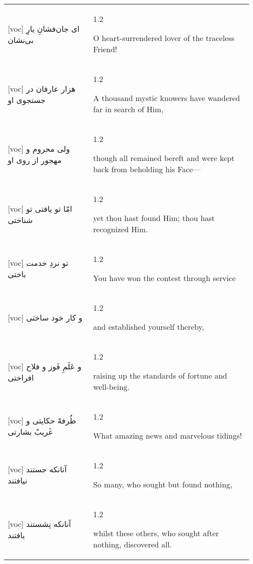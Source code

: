 \documentclass[11pt]{article}
\makeatletter
\newenvironment{orig}
  {\begin{farsi}[voc]}
  {\end{farsi}}
\newenvironment{trans}
  {\Large\begin{spacing}{1.2}\raggedright}
  {\end{spacing}}
\newenvironment{word}
  {\begin{tabular}[t]{p{2.75in}@{\hspace{3em}}p{2.875in}}}
  {\end{tabular}}
\newcommand{\ayat}[2]{\begin{orig}#1\end{orig} & \begin{trans}#2\end{trans}}
\makeatother
\begin{document}
\newpage

\begin{word}
\ayat{
ای جان‌فشانِ يارِ بی‌نشان
}{O heart-surrendered lover of the traceless Friend!} \vspace{-1ex}\\ \ayat{
هزار عارفان در جستجوی او
}{A thousand mystic knowers have wandered far in search of Him,} \vspace{-1ex}\\ \ayat{
ولی محروم و مهجور از روی او
}{though all remained bereft and were kept back from beholding his Face---} \vspace{-1ex}\\ \ayat{
امّا تو يافتی تو شناختی
}{yet thou hast found Him; thou hast recognized Him.} \vspace{-1ex}\\ \ayat{
تو نردِ خدمت باختی
}{You have won the contest through service} \vspace{-1ex}\\ \ayat{
و کار خود ساختی
}{and established yourself thereby,} \vspace{-1ex}\\ \ayat{
و عَلَمِ فَوز و فلاح افراختی
}{raising up the standards of fortune and well-being.} \vspace{-1ex}\\ \ayat{
طُرفهْ حکايتی و غَريبْ بشارتی
}{What amazing news and marvelous tidings!} \vspace{-1ex}\\ \ayat{
آنانکه جستند نيافتند
}{So many, who sought but found nothing,} \vspace{-1ex}\\ \ayat{
آنانکه نِشستند يافتند
}{whilst these others, who sought after nothing, discovered all.}
\end{word}

\newpage
\end{document}
